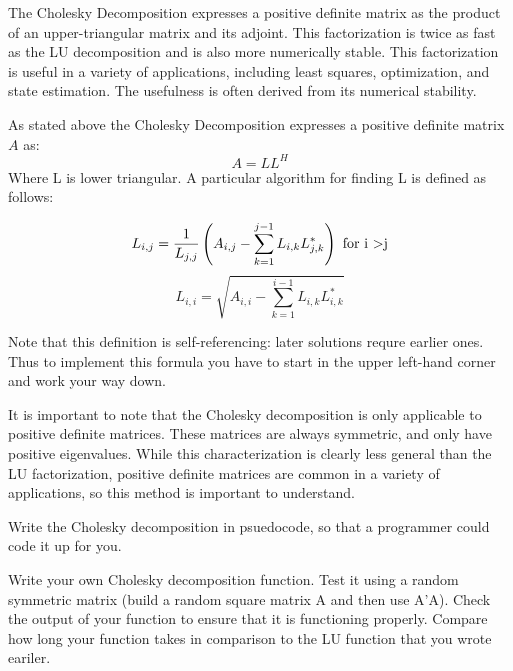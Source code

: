 

The Cholesky Decomposition expresses a positive definite matrix as the product of an upper-triangular matrix and its adjoint. This factorization is twice as fast as the LU decomposition and is also more numerically stable. This factorization is useful in a variety of applications, including least squares, optimization, and state estimation. The usefulness is often derived from its numerical stability.

As stated above the Cholesky Decomposition expresses a positive definite matrix $A$ as:
\[
A = LL^H
\]
Where L is lower triangular. A particular algorithm for finding L is defined as follows:

\[
L_{i,j} = \frac{1}{L_{j,j}}\left(A_{i,j} -\sum_{k=1}^{j-1}{L_{i,k}L_{j,k}^*}\right) \mbox{ for i \textgreater  j}
\]
\[
L_{i,i} = \sqrt{A_{i,i} - \sum_{k=1}^{i-1}{L_{i,k}L_{i,k}^*}}
\]

Note that this definition is self-referencing: later solutions requre earlier ones. Thus to implement this formula you have to start in the upper left-hand corner and work your way down.

It is important to note that the Cholesky decomposition is only applicable to positive definite matrices. These matrices are always symmetric, and only have positive eigenvalues. While this characterization is clearly less general than the LU factorization, positive definite matrices are common in a variety of applications, so this method is important to understand.

\begin{problem}
Write the Cholesky decomposition in psuedocode, so that a programmer could code it up for you.
\end{problem}

\begin{problem}
Write your own Cholesky decomposition function. Test it using a random symmetric matrix (build a random square matrix A and then use A'A). Check the output of your function to ensure that it is functioning properly. Compare how long your function takes in comparison to the LU function that you wrote eariler.
\end{problem}
